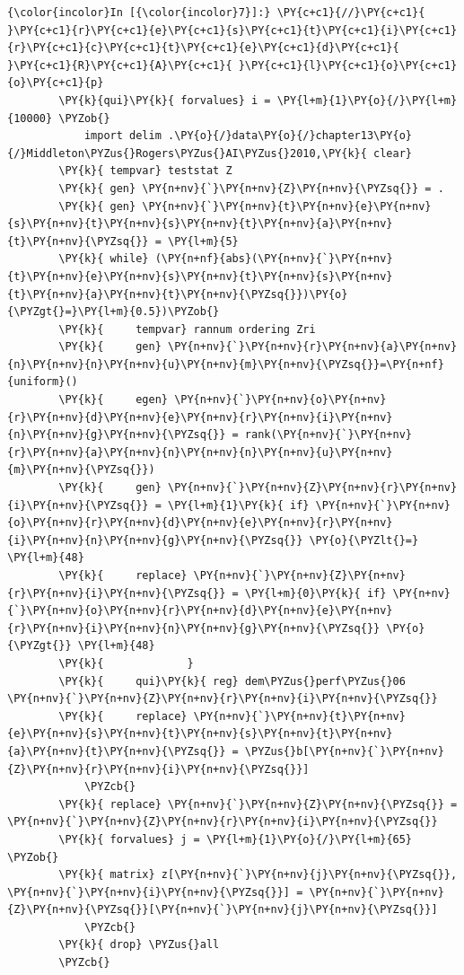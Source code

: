 \documentclass[11pt,notitlepage]{article}\usepackage[]{graphicx}\usepackage[]{color}
\makeatletter
\newenvironment{kframe}{%
 \def\at@end@of@kframe{}%
 \ifinner\ifhmode%
  \def\at@end@of@kframe{\end{minipage}}%
  \begin{minipage}{\columnwidth}%
 \fi\fi%
 \def\FrameCommand##1{\hskip\@totalleftmargin \hskip-\fboxsep
 \colorbox{shadecolor}{##1}\hskip-\fboxsep
     \hskip-\linewidth \hskip-\@totalleftmargin \hskip\columnwidth}%
 \MakeFramed {\advance\hsize-\width
   \@totalleftmargin\z@ \linewidth\hsize
   \@setminipage}}%
 {\par\unskip\endMakeFramed%
 \at@end@of@kframe}
\newenvironment{knitrout}{}{} %
\makeatother
\begin{document}
\begin{enumerate}[a)]
\begin{knitrout}
\begin{kframe}
    \begin{Verbatim}[commandchars=\\\{\}]
{\color{incolor}In [{\color{incolor}7}]:} \PY{c+c1}{//}\PY{c+c1}{ }\PY{c+c1}{r}\PY{c+c1}{e}\PY{c+c1}{s}\PY{c+c1}{t}\PY{c+c1}{i}\PY{c+c1}{r}\PY{c+c1}{c}\PY{c+c1}{t}\PY{c+c1}{e}\PY{c+c1}{d}\PY{c+c1}{ }\PY{c+c1}{R}\PY{c+c1}{A}\PY{c+c1}{ }\PY{c+c1}{l}\PY{c+c1}{o}\PY{c+c1}{o}\PY{c+c1}{p}
        \PY{k}{qui}\PY{k}{ forvalues} i = \PY{l+m}{1}\PY{o}{/}\PY{l+m}{10000} \PYZob{}
        	import delim .\PY{o}{/}data\PY{o}{/}chapter13\PY{o}{/}Middleton\PYZus{}Rogers\PYZus{}AI\PYZus{}2010,\PY{k}{ clear}	
        \PY{k}{	tempvar} teststat Z
        \PY{k}{	gen} \PY{n+nv}{`}\PY{n+nv}{Z}\PY{n+nv}{\PYZsq{}} = .
        \PY{k}{	gen} \PY{n+nv}{`}\PY{n+nv}{t}\PY{n+nv}{e}\PY{n+nv}{s}\PY{n+nv}{t}\PY{n+nv}{s}\PY{n+nv}{t}\PY{n+nv}{a}\PY{n+nv}{t}\PY{n+nv}{\PYZsq{}} = \PY{l+m}{5}
        \PY{k}{	while} (\PY{n+nf}{abs}(\PY{n+nv}{`}\PY{n+nv}{t}\PY{n+nv}{e}\PY{n+nv}{s}\PY{n+nv}{t}\PY{n+nv}{s}\PY{n+nv}{t}\PY{n+nv}{a}\PY{n+nv}{t}\PY{n+nv}{\PYZsq{}})\PY{o}{\PYZgt{}=}\PY{l+m}{0.5})\PYZob{}
        \PY{k}{		tempvar} rannum ordering Zri 
        \PY{k}{	    gen} \PY{n+nv}{`}\PY{n+nv}{r}\PY{n+nv}{a}\PY{n+nv}{n}\PY{n+nv}{n}\PY{n+nv}{u}\PY{n+nv}{m}\PY{n+nv}{\PYZsq{}}=\PY{n+nf}{uniform}()
        \PY{k}{		egen} \PY{n+nv}{`}\PY{n+nv}{o}\PY{n+nv}{r}\PY{n+nv}{d}\PY{n+nv}{e}\PY{n+nv}{r}\PY{n+nv}{i}\PY{n+nv}{n}\PY{n+nv}{g}\PY{n+nv}{\PYZsq{}} = rank(\PY{n+nv}{`}\PY{n+nv}{r}\PY{n+nv}{a}\PY{n+nv}{n}\PY{n+nv}{n}\PY{n+nv}{u}\PY{n+nv}{m}\PY{n+nv}{\PYZsq{}})
        \PY{k}{		gen} \PY{n+nv}{`}\PY{n+nv}{Z}\PY{n+nv}{r}\PY{n+nv}{i}\PY{n+nv}{\PYZsq{}} = \PY{l+m}{1}\PY{k}{ if} \PY{n+nv}{`}\PY{n+nv}{o}\PY{n+nv}{r}\PY{n+nv}{d}\PY{n+nv}{e}\PY{n+nv}{r}\PY{n+nv}{i}\PY{n+nv}{n}\PY{n+nv}{g}\PY{n+nv}{\PYZsq{}} \PY{o}{\PYZlt{}=} \PY{l+m}{48}
        \PY{k}{		replace} \PY{n+nv}{`}\PY{n+nv}{Z}\PY{n+nv}{r}\PY{n+nv}{i}\PY{n+nv}{\PYZsq{}} = \PY{l+m}{0}\PY{k}{ if} \PY{n+nv}{`}\PY{n+nv}{o}\PY{n+nv}{r}\PY{n+nv}{d}\PY{n+nv}{e}\PY{n+nv}{r}\PY{n+nv}{i}\PY{n+nv}{n}\PY{n+nv}{g}\PY{n+nv}{\PYZsq{}} \PY{o}{\PYZgt{}} \PY{l+m}{48}
        \PY{k}{				}
        \PY{k}{		qui}\PY{k}{ reg} dem\PYZus{}perf\PYZus{}06 \PY{n+nv}{`}\PY{n+nv}{Z}\PY{n+nv}{r}\PY{n+nv}{i}\PY{n+nv}{\PYZsq{}}		
        \PY{k}{		replace} \PY{n+nv}{`}\PY{n+nv}{t}\PY{n+nv}{e}\PY{n+nv}{s}\PY{n+nv}{t}\PY{n+nv}{s}\PY{n+nv}{t}\PY{n+nv}{a}\PY{n+nv}{t}\PY{n+nv}{\PYZsq{}} = \PYZus{}b[\PY{n+nv}{`}\PY{n+nv}{Z}\PY{n+nv}{r}\PY{n+nv}{i}\PY{n+nv}{\PYZsq{}}]
        	\PYZcb{}
        \PY{k}{	replace} \PY{n+nv}{`}\PY{n+nv}{Z}\PY{n+nv}{\PYZsq{}} = \PY{n+nv}{`}\PY{n+nv}{Z}\PY{n+nv}{r}\PY{n+nv}{i}\PY{n+nv}{\PYZsq{}}
        \PY{k}{	forvalues} j = \PY{l+m}{1}\PY{o}{/}\PY{l+m}{65} \PYZob{}
        \PY{k}{	matrix} z[\PY{n+nv}{`}\PY{n+nv}{j}\PY{n+nv}{\PYZsq{}}, \PY{n+nv}{`}\PY{n+nv}{i}\PY{n+nv}{\PYZsq{}}] = \PY{n+nv}{`}\PY{n+nv}{Z}\PY{n+nv}{\PYZsq{}}[\PY{n+nv}{`}\PY{n+nv}{j}\PY{n+nv}{\PYZsq{}}]
        	\PYZcb{}
        \PY{k}{	drop} \PYZus{}all
        \PYZcb{}
\end{Verbatim}


\end{kframe}
\end{knitrout}
\end{enumerate}
\end{document}

